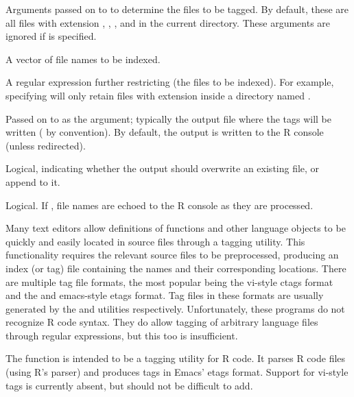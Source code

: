 %
\begin{Arguments}
\begin{ldescription}
\item[\code{path, pattern, recursive}] 
Arguments passed on to  to determine the
files to be tagged.  By default, these are all files with extension
, , , and  in the current
directory.  These arguments are ignored if  is specified.

\item[\code{src}] 
A vector of file names to be indexed.

\item[\code{keep.re}]  A regular expression further restricting 
(the files to be indexed).  For example, specifying
 will only retain files with
extension  inside a directory named .

\item[\code{ofile}]  Passed on to  as the 
argument; typically the output file where the tags will be written
( by convention).  By default, the output is written to
the R console (unless redirected).

\item[\code{append}]  Logical, indicating whether the output should overwrite
an existing file, or append to it.

\item[\code{verbose}]  Logical.  If , file names are echoed to the
R console as they are processed.

\end{ldescription}
\end{Arguments}
%
\begin{Details}\relax

Many text editors allow definitions of functions and other language
objects to be quickly and easily located in source files through a
tagging utility.  This functionality requires the relevant source
files to be preprocessed, producing an index (or tag) file containing
the names and their corresponding locations.  There are multiple tag
file formats, the most popular being the vi-style ctags format and the
and emacs-style etags format.  Tag files in these formats are usually
generated by the  and  utilities respectively.
Unfortunately, these programs do not recognize R code syntax.  They do
allow tagging of arbitrary language files through regular expressions,
but this too is insufficient.

The  function is intended to be a tagging utility for R
code.  It parses R code files (using R's parser) and produces tags in
Emacs' etags format.  Support for vi-style tags is currently absent,
but should not be difficult to add.
\end{Details}
